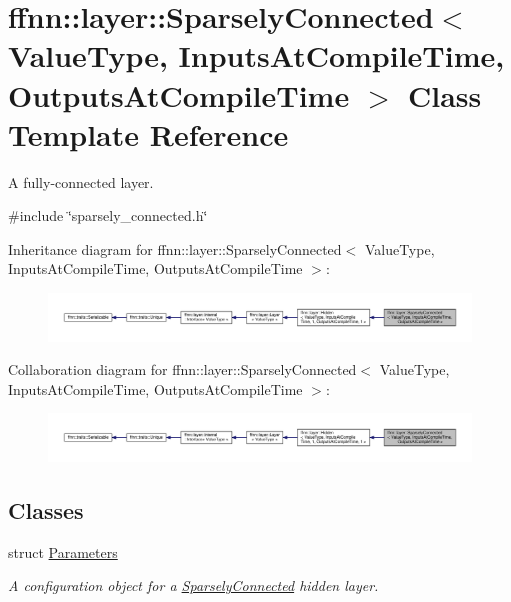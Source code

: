 \hypertarget{classffnn_1_1layer_1_1_sparsely_connected}{\section{ffnn\-:\-:layer\-:\-:Sparsely\-Connected$<$ Value\-Type, Inputs\-At\-Compile\-Time, Outputs\-At\-Compile\-Time $>$ Class Template Reference}
\label{classffnn_1_1layer_1_1_sparsely_connected}
}


A fully-\/connected layer.  




{\ttfamily \#include \char`\"{}sparsely\-\_\-connected.\-h\char`\"{}}



Inheritance diagram for ffnn\-:\-:layer\-:\-:Sparsely\-Connected$<$ Value\-Type, Inputs\-At\-Compile\-Time, Outputs\-At\-Compile\-Time $>$\-:
\nopagebreak
\begin{figure}[H]
\begin{center}
\leavevmode
\includegraphics[width=350pt]{classffnn_1_1layer_1_1_sparsely_connected__inherit__graph}
\end{center}
\end{figure}


Collaboration diagram for ffnn\-:\-:layer\-:\-:Sparsely\-Connected$<$ Value\-Type, Inputs\-At\-Compile\-Time, Outputs\-At\-Compile\-Time $>$\-:
\nopagebreak
\begin{figure}[H]
\begin{center}
\leavevmode
\includegraphics[width=350pt]{classffnn_1_1layer_1_1_sparsely_connected__coll__graph}
\end{center}
\end{figure}
\subsection*{Classes}
\begin{DoxyCompactItemize}
\item 
struct \hyperlink{structffnn_1_1layer_1_1_sparsely_connected_1_1_parameters}{Parameters}
\begin{DoxyCompactList}\small\item\em A configuration object for a \hyperlink{classffnn_1_1layer_1_1_sparsely_connected}{Sparsely\-Connected} hidden layer. \end{DoxyCompactList}\end{DoxyCompactItemize}
